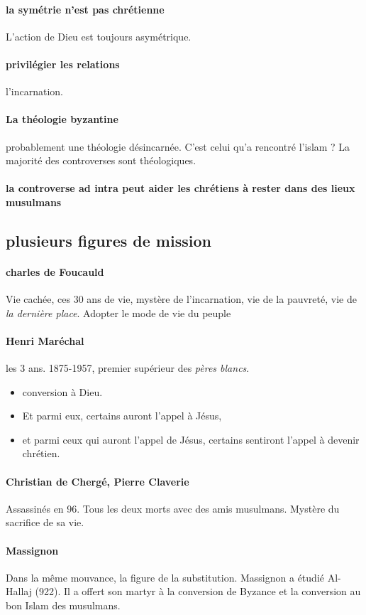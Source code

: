 \paragraph{la symétrie n'est pas chrétienne} L'action de Dieu est toujours asymétrique. 

\paragraph{privilégier les relations} l'incarnation. 

\paragraph{La théologie byzantine} probablement une théologie désincarnée. C'est celui qu'a rencontré l'islam ? La majorité des controverses sont théologiques. 

\paragraph{la controverse ad intra peut aider les chrétiens à rester dans des lieux musulmans}


\subsection{plusieurs figures de mission}

\paragraph{charles de Foucauld} Vie cachée, ces 30 ans de vie, mystère de l'incarnation, vie de la pauvreté, vie de \textit{la dernière place}. Adopter le mode de vie du peuple

\paragraph{Henri Maréchal} les 3 ans. 1875-1957, premier supérieur des \textit{pères blancs}.  
\begin{itemize}
    \item conversion à Dieu. 
       \item Et parmi eux, certains auront l'appel à Jésus, 
          \item et parmi ceux qui auront l'appel de Jésus, certains sentiront l'appel à devenir chrétien.
\end{itemize}

\paragraph{Christian de Chergé, Pierre Claverie} Assassinés en 96. Tous les deux morts avec des amis musulmans. Mystère du sacrifice de sa vie. 

\paragraph{Massignon}
Dans la même mouvance, la figure de la substitution. Massignon a étudié Al-Hallaj (922). Il a offert son martyr à la conversion de Byzance et la conversion au bon Islam des musulmans.
